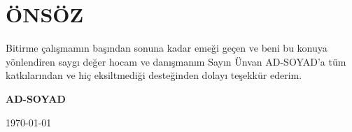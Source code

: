 \section*{ÖNSÖZ}
Bitirme çalışmamın başından sonuna kadar emeği geçen ve beni bu konuya yönlendiren saygı değer hocam ve danışmanım Sayın Ünvan AD-SOYAD'a tüm katkılarından ve hiç eksiltmediği desteğinden dolayı teşekkür ederim.

\begin{flushright}
\textbf{AD-SOYAD}

\today
\end{flushright}